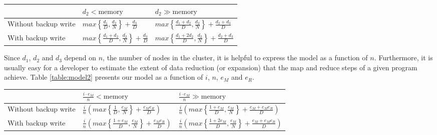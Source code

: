 \documentclass{acm_proc_article-sp}
\begin{document}
\begin{table*}
\centering
\renewcommand{\arraystretch}{1.2}
\begin{tabular}{|l|l|l|}
\hline
& $d_2 < \text{memory}$ & $d_2 \gg \text{memory}$ \\ \hline
Without backup write & $max\left\{\frac{d_1}{D}, \frac{d_2}{N}\right\} + \frac{d_3}{D}$ & $max\left\{\frac{d_1 + d_2}{D}, \frac{d_2}{N}\right\} + \frac{d_2 + d_3}{D}$ \\ \hline
With backup write & $max\left\{\frac{d_1 + d_2}{D}, \frac{d_2}{N}\right\} + \frac{d_3}{D}$
& $max\left\{\frac{d_1 + 2 d_2}{D}, \frac{d_2}{N}\right\} + \frac{d_2 + d_3}{D}$ \\ \hline
\end{tabular}
\caption{The execution time of a map-reduce computation on a parallel dataflow system. $D$ and $N$ are the disk and network throughputs of a single node, respectively.}
\label{table:model1}
\end{table*}

Since $d_1$, $d_2$ and $d_3$ depend on $n$, the number of nodes in the cluster, it is helpful to express the model as a function of $n$. Furthermore, it is usually easy for a developer to estimate  the extent of data reduction (or expansion) that the map and reduce steps of a given program achieve. Table \ref{table:model2} presents our model as a function of $i$, $n$, $e_M$ and $e_R$.

\begin{table*}
\centering
\renewcommand{\arraystretch}{1.2}
\begin{tabular}{|l|l|l|}
\hline
& $\frac{i \cdot e_M}{n}< \text{memory}$ & $\frac{i \cdot e_M}{n} \gg \text{memory}$ \\ \hline
Without backup write & $\frac{i}{n} \left( max\left\{\frac{1}{D}, \frac{e_M}{N}\right\} + \frac{e_M e_R}{D} \right)$ & $\frac{i}{n} \left( max\left\{\frac{1 + e_M}{D}, \frac{e_M}{N}\right\} + \frac{e_M + e_M e_R}{D} \right)$ \\ \hline
With backup write & $\frac{i}{n} \left( max\left\{\frac{1 + e_M}{D}, \frac{e_M}{N}\right\} + \frac{e_M e_R}{D} \right)$
& $\frac{i}{n} \left( max\left\{\frac{1 + 2 e_M}{D}, \frac{e_M}{N}\right\} + \frac{e_M + e_M e_R}{D} \right)$ \\ \hline
\end{tabular}
\caption{The execution time of a map-reduce computation on a parallel dataflow system, as a function of the total amount of input data ($i$), and the map-reduce data expansion ratios ($e_M$ and $e_R$).}
\label{table:model2}
\end{table*}
\end{document}
